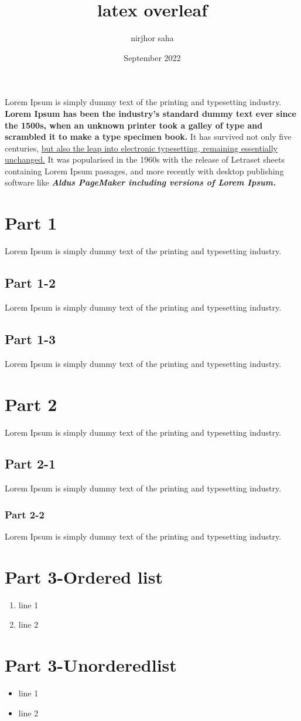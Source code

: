 \documentclass{article}
\title{latex overleaf}
\author{nirjhor saha}
\date{September 2022}
\begin{document}
\maketitle
Lorem Ipsum is simply dummy text of the printing and typesetting industry. \textbf{Lorem Ipsum has been the industry's standard dummy text ever since the 1500s, when an unknown printer took a galley of type and scrambled it to make a type specimen book.} It has survived not only five centuries, \underline{but also the leap into electronic typesetting, remaining essentially unchanged.} It was popularised in the 1960s with the release of Letraset sheets containing Lorem Ipsum passages, and more recently with desktop publishing software like \textbf{\textit{ Aldus PageMaker including versions of Lorem Ipsum.}}

\section{Part 1}
Lorem Ipsum is simply dummy text of the printing and typesetting industry.
\subsection{Part 1-2}
Lorem Ipsum is simply dummy text of the printing and typesetting industry.
\subsection{Part 1-3}
Lorem Ipsum is simply dummy text of the printing and typesetting industry.

\section{Part 2}
Lorem Ipsum is simply dummy text of the printing and typesetting industry.
\subsection{Part 2-1}
Lorem Ipsum is simply dummy text of the printing and typesetting industry.
\subsubsection{Part 2-2}
Lorem Ipsum is simply dummy text of the printing and typesetting industry.

\section{Part 3-Ordered list}
\begin{enumerate}
    \item line 1
    \item line 2
\end{enumerate}

\section{Part 3-Unorderedlist}
\begin{itemize}
    \item line 1
    \item line 2 
\end{itemize}
\end{document}
